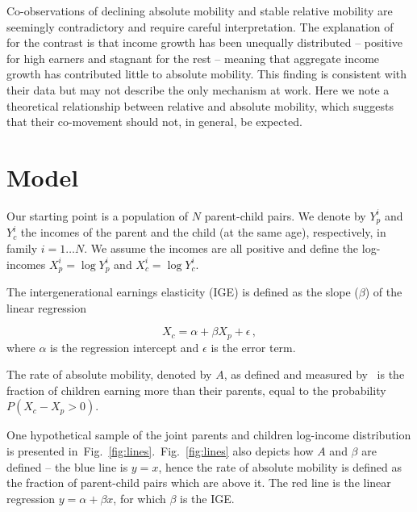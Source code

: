 \documentclass[12pt,times,letter]{article}
\newcommand{\fref}[1]{Fig.~\ref{fig:#1}}
\newcommand{\be}{\begin{equation}}
\newcommand{\ee}{\end{equation}}
\numberwithin{equation}{section}
\begin{document}
Co-observations of declining absolute mobility and stable relative mobility are seemingly contradictory and require careful interpretation. The explanation of~\citet{chetty2017fading} for the contrast is that income growth has been unequally distributed -- positive for high earners and stagnant for the rest -- meaning that aggregate income growth has contributed little to absolute mobility. This finding is consistent with their data but may not describe the only mechanism at work. Here we note a theoretical relationship between relative and absolute mobility, which suggests that their co-movement should not, in general, be expected.

\section{Model}

Our starting point is a population of $N$ parent-child pairs. We denote by $Y_p^i$ and $Y_c^i$ the incomes of the parent and the child (at the same age), respectively, in family $i=1\dots N$. We assume the incomes are all positive and define the log-incomes $X_p^i=\log Y_p^i$ and $X_c^i=\log Y_c^i$.

The intergenerational earnings elasticity (IGE) is defined as the slope ($\beta$) of the linear regression

\be
X_c = \alpha + \beta X_p + \epsilon\,,
\ee
where $\alpha$ is the regression intercept and $\epsilon$ is the error term.

The rate of absolute mobility, denoted by $A$, as defined and measured by~\citet{chetty2017fading} is the fraction of children earning more than their parents, equal to the probability $P\left(X_c-X_p > 0\right)$.

One hypothetical sample of the joint parents and children log-income distribution is presented in~\fref{lines}.~\fref{lines} also depicts how $A$ and $\beta$ are defined -- the blue line is $y=x$, hence the rate of absolute mobility is defined as the fraction of parent-child pairs which are above it. The red line is the linear regression $y=\alpha +\beta x$, for which $\beta$ is the IGE.
\end{document}
